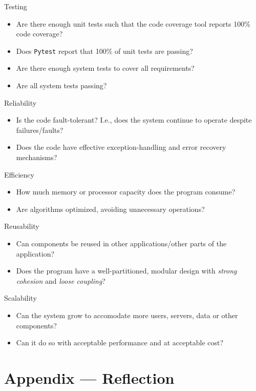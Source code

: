 \documentclass[12pt, titlepage]{article}
\begin{document}
\noindent
Testing
\begin{itemize}[label=$\square$]
  \item Are there enough unit tests such that the code coverage tool reports 100\% code coverage?
  \item Does \texttt{Pytest} report that 100\% of unit tests are passing? 
  \item Are there enough system tests to cover all requirements? 
  \item Are all system tests passing? 
\end{itemize}

\noindent
Reliability
\begin{itemize}[label=$\square$]
  \item Is the code fault-tolerant? I.e., does the system continue to operate despite failures/faults?
  \item Does the code have effective exception-handling and error recovery mechanisms?
\end{itemize}

\noindent
Efficiency
\begin{itemize}[label=$\square$]
  \item How much memory or processor capacity does the program consume?
  \item Are algorithms optimized, avoiding unnecessary operations?
\end{itemize}

\noindent
Reusability
\begin{itemize}[label=$\square$]
  \item Can components be reused in other applications/other parts of the application?
  \item Does the program have a well-partitioned, modular design with \emph{strong cohesion} and \emph{loose coupling}?
\end{itemize}

\noindent
Scalability
\begin{itemize}[label=$\square$]
  \item Can the system grow to accomodate more users, servers, data or other components?
  \item Can it do so with acceptable performance and at acceptable cost?
\end{itemize}

\newpage{}
\section*{Appendix --- Reflection}
\end{document}
